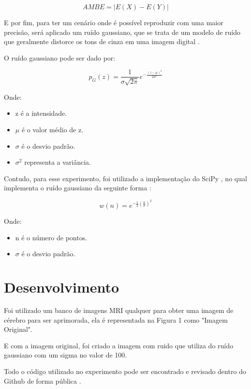 \documentclass[conference]{IEEEtran}
\begin{document}
\begin{equation}
AMBE = |E(X) - E(Y)|     
\end{equation}

E por fim, para ter um cenário onde é possível reproduzir com uma maior precisão, será aplicado um ruído gaussiano, que se trata de um modelo de ruído que geralmente distorce os tons de cinza em uma imagem digital \cite{b15}.

O ruído gaussiano pode ser dado por:

\begin{equation}
p_{G}(z)={\frac {1}{\sigma {\sqrt {2\pi }}}}e^{-{\frac {(z-\mu )^{2}}{2\sigma ^{2}}}}
\end{equation}

Onde:

\begin{itemize}
\item z é a intensidade.
\item \({\mu}\) é o valor médio de z.
\item \({\sigma}\) é o desvio padrão.
\item \({\sigma^2}\)  representa a variância.
\end{itemize}

Contudo, para esse experimento, foi utilizado a implementação do SciPy \cite{b4}, no qual implementa o ruído gaussiano da seguinte forma \cite{b15}:

\begin{equation}
w(n) = e^{ -\frac{1}{2}\left(\frac{n}{\sigma}\right)^2 }
\end{equation}

Onde:

\begin{itemize}
\item n é o número de pontos.
\item \({\sigma}\) é o desvio padrão.
\end{itemize}

\section{Desenvolvimento}

Foi utilizado um banco de imagens MRI qualquer para obter uma imagem de cérebro para ser aprimorada, ela é representada na Figura 1 como "Imagem Original".

E com a imagem original, foi criado a imagem com ruido que utiliza do ruído gaussiano com um sigma no valor de 100. 

Todo o código utilizado no experimento pode ser encontrado e revisado dentro do Github de forma pública \cite{b16}.
\end{document}
